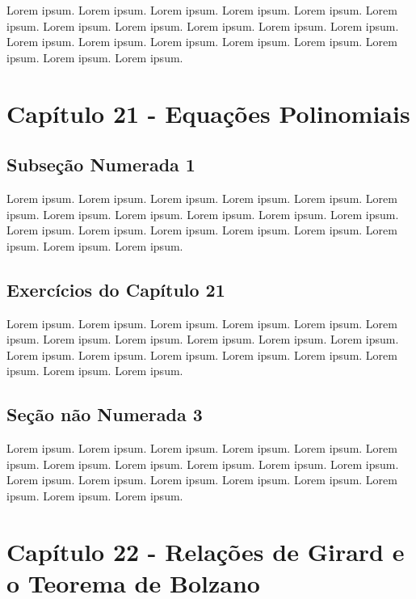 \documentclass[
]{book}
\begin{document}
Lorem ipsum. Lorem ipsum. Lorem ipsum. Lorem ipsum. Lorem ipsum. Lorem ipsum. Lorem ipsum. Lorem ipsum. Lorem ipsum. Lorem ipsum. Lorem ipsum. Lorem ipsum. Lorem ipsum. Lorem ipsum. Lorem ipsum. Lorem ipsum. Lorem ipsum. Lorem ipsum. Lorem ipsum.

\hypertarget{capuxedtulo-21---equauxe7uxf5es-polinomiais}{%
\section{Capítulo 21 - Equações Polinomiais}\label{capuxedtulo-21---equauxe7uxf5es-polinomiais}}

\hypertarget{subseuxe7uxe3o-numerada-1-2}{%
\subsection{Subseção Numerada 1}\label{subseuxe7uxe3o-numerada-1-2}}

Lorem ipsum. Lorem ipsum. Lorem ipsum. Lorem ipsum. Lorem ipsum. Lorem ipsum. Lorem ipsum. Lorem ipsum. Lorem ipsum. Lorem ipsum. Lorem ipsum. Lorem ipsum. Lorem ipsum. Lorem ipsum. Lorem ipsum. Lorem ipsum. Lorem ipsum. Lorem ipsum. Lorem ipsum.

\hypertarget{exercuxedcios-do-capuxedtulo-21}{%
\subsection{Exercícios do Capítulo 21}\label{exercuxedcios-do-capuxedtulo-21}}

Lorem ipsum. Lorem ipsum. Lorem ipsum. Lorem ipsum. Lorem ipsum. Lorem ipsum. Lorem ipsum. Lorem ipsum. Lorem ipsum. Lorem ipsum. Lorem ipsum. Lorem ipsum. Lorem ipsum. Lorem ipsum. Lorem ipsum. Lorem ipsum. Lorem ipsum. Lorem ipsum. Lorem ipsum.

\hypertarget{seuxe7uxe3o-nuxe3o-numerada-3-2}{%
\subsection*{Seção não Numerada 3}\label{seuxe7uxe3o-nuxe3o-numerada-3-2}}

Lorem ipsum. Lorem ipsum. Lorem ipsum. Lorem ipsum. Lorem ipsum. Lorem ipsum. Lorem ipsum. Lorem ipsum. Lorem ipsum. Lorem ipsum. Lorem ipsum. Lorem ipsum. Lorem ipsum. Lorem ipsum. Lorem ipsum. Lorem ipsum. Lorem ipsum. Lorem ipsum. Lorem ipsum.

\hypertarget{capuxedtulo-22---relauxe7uxf5es-de-girard-e-o-teorema-de-bolzano}{%
\section{Capítulo 22 - Relações de Girard e o Teorema de Bolzano}\label{capuxedtulo-22---relauxe7uxf5es-de-girard-e-o-teorema-de-bolzano}}
\end{document}
